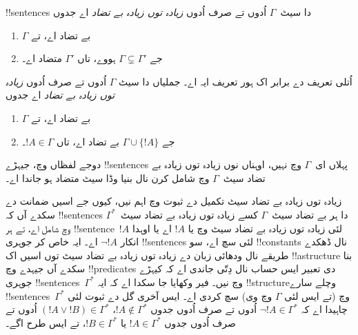 \documentclass[../../../include/open-logic-section]{subfiles}
\begin{document}

\begin{defn}
!!{sentence}s دا سیٹ~$\Gamma$ اُدوں تے صرف اُدوں \emph{زیادہ توں زیادہ بے تضاد} اے جدوں
\begin{enumerate}
\item $\Gamma$ بے تضاد اے، تے
\item جے $\Gamma \subsetneq \Gamma'$ ہووے، تاں $\Gamma'$ متضاد اے۔
\end{enumerate}
\end{defn}

\begin{explain}
اُتلی تعریف دے برابر اک ہور تعریف ایہ اے۔ جملیاں دا سیٹ $\Gamma$ اُدوں تے صرف اُدوں \emph{زیادہ توں زیادہ بے تضاد} اے جدوں
\begin{enumerate}
\item $\Gamma$ بے تضاد اے، تے
\item جے $\Gamma \cup \{ !A \}$ بے تضاد اے، تاں $!A \in \Gamma$۔
\end{enumerate}
دوجے لفظاں وچ، جیہڑے !!{sentence}s پہلاں ای~$\Gamma$ وچ نہیں، اوہناں نوں زیادہ توں زیادہ بے تضاد سیٹ~$\Gamma$ وچ شامل کرن نال بنیا وڈا سیٹ متضاد ہو جاندا اے۔
\end{explain}

\begin{explain}
زیادہ توں زیادہ بے تضاد سیٹ تکمیل دے ثبوت وچ اہم نیں، کیوں جے اسیں ضمانت دے سکدے آں کہ !!{sentence}s دا ہر بے تضاد سیٹ~$\Gamma$ کسے زیادہ توں زیادہ بے تضاد سیٹ~$\Gamma^*$ وچ شامل اے، تے ہر !!{sentence}~$!A$ لئی زیادہ توں زیادہ بے تضاد سیٹ وچ یا $!A$ اے یا اوہدا انکار $\lnot !A$ اے۔ ایہ خاص کر جوہری !!{sentence}s لئی سچ اے، سو !!{constant}s نال ڈھکدے طریقے نال ودھائی زبان دے زیادہ توں زیادہ بے تضاد سیٹ توں اسیں اک !!a{structure} بنا سکدے آں جیہدے وچ !!{predicate}s دی تعبیر ایس حساب نال دِتّی جاندی اے کہ کیہڑے جوہری !!{sentence}s~$\Gamma^*$ وچ نیں۔ فیر وکھایا جا سکدا اے کہ ایہ !!{structure}وچلے سارے !!{sentence}s~$\Gamma^*$ وچ (تے ایس لئی $\Gamma$ وچ وی) سچ کردی اے۔ ایس آخری گل دے ثبوت لئی چاہیدا اے کہ $\lnot !A \in
\Gamma^*$ اُدوں تے صرف اُدوں جدوں $!A \notin \Gamma^*$، $(!A \lor !B) \in \Gamma^*$ اُدوں تے صرف اُدوں جدوں $!A
\in \Gamma^*$ یا $!B \in \Gamma^*$، تے ایس طرح اگے۔
\end{explain}
\end{document}
